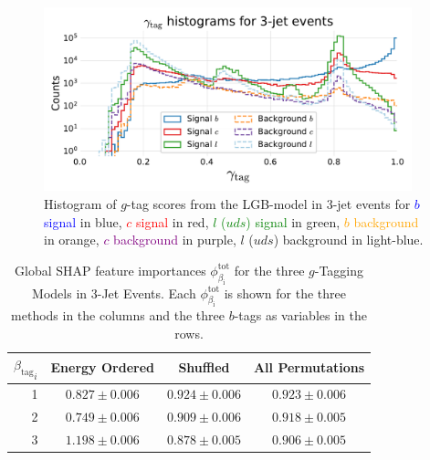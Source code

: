 \begin{figure}[h!]
    \includegraphics[width=0.95\textwidth, trim=10 10 10 45, clip]{figures/quarks/gtag-histogram-sigbkg-down_sample=1.00-ML_vars=vertex-selection=b-ejet_min=4-n_iter_RS_lgb=99-n_iter_RS_xgb=9-cdot_cut=0.90-version=19-njet=3.pdf}
    \caption[Distribution of $g$-Tag Scores in 3-Jet Events for Signal and Background]
            {Histogram of $g$-tag scores from the LGB-model in 3-jet events for \textcolor{blue}{$b$ signal} in blue, \textcolor{red}{$c$ signal} in red, \textcolor{green}{$l$ ($uds$) signal} in green, \textcolor{orange}{$b$ background} in orange, \textcolor{purple}{$c$ background} in purple, \textcolor{light-blue}{$l$ ($uds$) background} in light-blue.
            } 
    \label{fig:q:gtag_scores_3j_sig_bkg}
  \end{figure}



\begin{table}[!ht]
    \centerfloat
    \begin{tabular}{@{}rccc@{}}
    ${\beta_\mathrm{tag}}_i$  & Energy Ordered & Shuffled & All Permutations \\ \midrule
  1 & $ 0.827 \pm 0.006 $  &  $ 0.924 \pm 0.006 $  &  $ 0.923 \pm 0.006 $  \\
  2 & $ 0.749 \pm 0.006 $  &  $ 0.909 \pm 0.006 $  &  $ 0.918 \pm 0.005 $  \\
  3 & $ 1.198 \pm 0.006 $  &  $ 0.878 \pm 0.005 $  &  $ 0.906 \pm 0.005 $  \\
  \end{tabular}
  \caption[Global SHAP Feature Importances for the $g$-Tagging Models in 3-Jet Events]{Global SHAP feature importances $\phi^\mathrm{tot}_{\beta_\mathrm{i}}$ for the three $g$-Tagging Models in 3-Jet Events. Each $\phi^\mathrm{tot}_{\beta_\mathrm{i}}$ is shown for the three methods in the columns and the three $b$-tags as variables in the rows.}
  \label{table:q:shap_g_taggging_global_3j}
\end{table}




